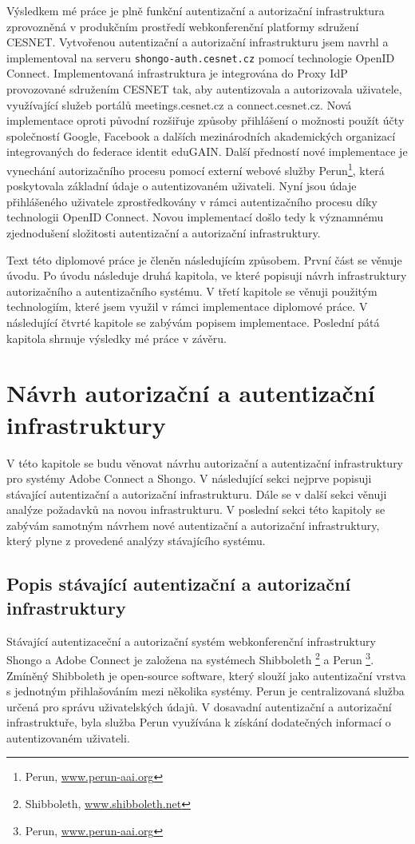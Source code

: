 \documentclass[
  printed, %
  twoside, %
  table,   %
  nolof,     %
  nolot,     %
]{fithesis3}
\begin{document}
Výsledkem mé práce je plně funkční autentizační a autorizační infrastruktura zprovozněná v produkčním prostředí webkonferenční platformy sdružení CESNET. Vytvořenou autentizační a autorizační infrastrukturu jsem navrhl a implementoval na serveru \texttt{shongo-auth.cesnet.cz} pomocí technologie OpenID Connect. Implementovaná infrastruktura je integrována do Proxy IdP provozované sdružením CESNET tak, aby autentizovala a autorizovala uživatele, využívající služeb portálů meetings.cesnet.cz a connect.cesnet.cz. Nová implementace oproti původní rozšiřuje způsoby přihlášení o možnosti použít účty společností Google, Facebook a dalších mezinárodních akademických organizací integrovaných do federace identit eduGAIN. Další předností nové implementace je vynechání autorizačního procesu pomocí externí webové služby Perun\footnote{Perun, \url{www.perun-aai.org}}, která poskytovala základní údaje o autentizovaném uživateli. Nyní jsou údaje přihlášeného uživatele zprostředkovány v rámci autentizačního procesu díky technologii OpenID Connect. Novou implementací došlo tedy k významnému zjednodušení složitosti autentizační a autorizační infrastruktury. \par

Text této diplomové práce je členěn následujícím způsobem. První část se věnuje úvodu. Po úvodu následuje druhá kapitola, ve které popisuji návrh infrastruktury autorizačního a autentizačního systému. V třetí kapitole se věnuji použitým technologiím, které jsem využil v rámci implementace diplomové práce. V následující čtvrté kapitole se zabývám popisem implementace. Poslední pátá kapitola shrnuje výsledky mé práce v závěru. 

\chapter{Návrh autorizační a autentizační infrastruktury}
V této kapitole se budu věnovat návrhu autorizační a autentizační infrastruktury pro systémy Adobe Connect a Shongo. V následující sekci nejprve popisuji stávající autentizační a autorizační infrastrukturu. Dále se v další sekci věnuji analýze požadavků na novou infrastrukturu. V poslední sekci této kapitoly se zabývám samotným návrhem nové autentizační a autorizační infrastruktury, který plyne z provedené analýzy stávajícího systému.    

\section{Popis stávající autentizační a autorizační infrastruktury}
Stávající autentizaceční a autorizační systém webkonferenční infrastruktury Shongo a Adobe Connect je založena na systémech Shibboleth \footnote{Shibboleth, \url{www.shibboleth.net}} a Perun \footnote{Perun, \url{www.perun-aai.org}}. Zmíněný Shibboleth je open-source software, který slouží jako autentizační vrstva s jednotným přihlašováním mezi několika systémy. Perun je centralizovaná služba určená pro správu uživatelských údajů. V dosavadní autentizační a autorizační infrastruktuře, byla služba Perun využívána k získání dodatečných informací o autentizovaném uživateli. \par
\end{document}
